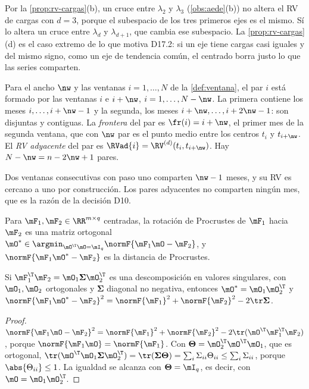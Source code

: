 Por la \cref{prop:rv-cargas}(b), un cruce entre $\lambda_2$ y $\lambda_3$ (\cref{obs:aede}(b)) no
altera el RV de cargas con $d=3$, porque el subespacio de los tres primeros ejes es el mismo. Sí lo
altera un cruce entre $\lambda_d$ y $\lambda_{d+1}$, que cambia ese subespacio. La
\cref{prop:rv-cargas}(d) es el caso extremo de lo que motiva D17.2: si un eje tiene cargas casi
iguales y del mismo signo, como un eje de tendencia común, el centrado borra justo lo que las
series comparten.

\begin{definicion}\label{def:pares}
Para el ancho $\nw$ y las ventanas $i=1,\dots,N$ de la \cref{def:ventana}, el par $i$ está formado
por las ventanas $i$ e $i+\nw$, $i=1,\dots,N-\nw$. La primera contiene los meses
$i,\dots,i+\nw-1$ y la segunda, los meses $i+\nw,\dots,i+2\nw-1$: son disjuntas y contiguas. La
\emph{frontera} del par es $\fr(i)=i+\nw$, el primer mes de la segunda ventana, que con $\nw$ par
es el punto medio entre los centros $t_i$ y $t_{i+\nw}$. El \emph{RV adyacente} del par es
$\RVad{i}=\RV^{(d)}(t_i,t_{i+\nw})$. Hay $N-\nw=n-2\nw+1$ pares.
\end{definicion}

Dos ventanas consecutivas con paso uno comparten $\nw-1$ meses, y su RV es cercano a uno por
construcción. Los pares adyacentes no comparten ningún mes, que es la razón de la decisión D10.

\begin{definicion}\label{def:procrustes}
Para $\mF_1,\mF_2\in\RR^{m\times q}$ centradas, la rotación de Procrustes de $\mF_1$ hacia
$\mF_2$ es una matriz ortogonal $\mO^\ast\in\argmin_{\mO^{\T}\mO=\mI_q}\normF{\mF_1\mO-\mF_2}$, y
$\normF{\mF_1\mO^\ast-\mF_2}$ es la distancia de Procrustes.
\end{definicion}

\begin{proposicion}\label{prop:procrustes}
Si $\mF_1^{\T}\mF_2=\mO_1\boldsymbol{\Sigma}\mO_2^{\T}$ es una descomposición en valores singulares,
con $\mO_1,\mO_2$ ortogonales y $\boldsymbol{\Sigma}$ diagonal no negativa, entonces
$\mO^\ast=\mO_1\mO_2^{\T}$ y
$\normF{\mF_1\mO^\ast-\mF_2}^2=\normF{\mF_1}^2+\normF{\mF_2}^2-2\tr\boldsymbol{\Sigma}$.
\end{proposicion}

\begin{proof}
$\normF{\mF_1\mO-\mF_2}^2=\normF{\mF_1}^2+\normF{\mF_2}^2-2\tr(\mO^{\T}\mF_1^{\T}\mF_2)$, porque
$\normF{\mF_1\mO}=\normF{\mF_1}$. Con $\boldsymbol{\Theta}=\mO_2^{\T}\mO^{\T}\mO_1$, que es ortogonal,
$\tr(\mO^{\T}\mO_1\boldsymbol{\Sigma}\mO_2^{\T})=\tr(\boldsymbol{\Sigma}\boldsymbol{\Theta})=
\sum_i\Sigma_{ii}\Theta_{ii}\le\sum_i\Sigma_{ii}$, porque $\abs{\Theta_{ii}}\le1$. La igualdad se alcanza con
$\boldsymbol{\Theta}=\mI_q$, es decir, con $\mO=\mO_1\mO_2^{\T}$.
\end{proof}

